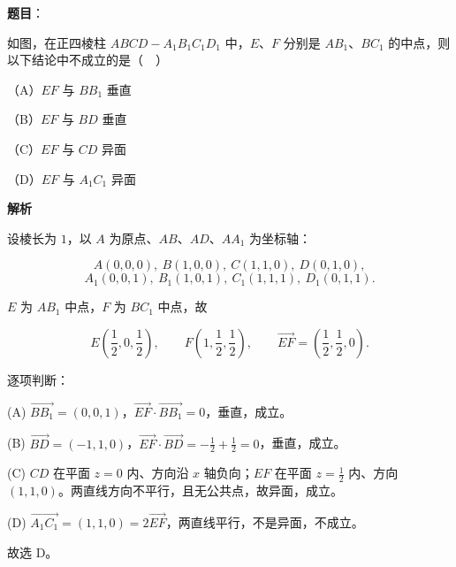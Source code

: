 \begin{answer}

\textbf{题目}：

如图，在正四棱柱 $ABCD-A_1B_1C_1D_1$ 中，$E$、$F$ 分别是 $AB_1$、$BC_1$ 的中点，则以下结论中不成立的是（　）
\nopagebreak[4]
\begin{center}\end{center}
\nopagebreak[4]
（A）$EF$ 与 $BB_1$ 垂直

（B）$EF$ 与 $BD$ 垂直

（C）$EF$ 与 $CD$ 异面

（D）$EF$ 与 $A_1C_1$ 异面

\textbf{解析}

设棱长为 $1$，以 $A$ 为原点、$AB$、$AD$、$AA_1$ 为坐标轴：

\nopagebreak[4]
\[A(0,0,0),\ B(1,0,0),\ C(1,1,0),\ D(0,1,0),\]
\nopagebreak[4]
\[A_1(0,0,1),\ B_1(1,0,1),\ C_1(1,1,1),\ D_1(0,1,1).\]

$E$ 为 $AB_1$ 中点，$F$ 为 $BC_1$ 中点，故

\nopagebreak[4]
\[E\left(\frac12,0,\frac12\right),\qquad F\left(1,\frac12,\frac12\right),\qquad \overrightarrow{EF}=\left(\frac12,\frac12,0\right).\]

逐项判断：

(A) $\overrightarrow{BB_1}=(0,0,1)$，$\overrightarrow{EF}\cdot\overrightarrow{BB_1}=0$，垂直，成立。

(B) $\overrightarrow{BD}=(-1,1,0)$，$\overrightarrow{EF}\cdot\overrightarrow{BD}=-\frac12+\frac12=0$，垂直，成立。

(C) $CD$ 在平面 $z=0$ 内、方向沿 $x$ 轴负向；$EF$ 在平面 $z=\frac12$ 内、方向 $(1,1,0)$。两直线方向不平行，且无公共点，故异面，成立。

(D) $\overrightarrow{A_1C_1}=(1,1,0)=2\overrightarrow{EF}$，两直线平行，不是异面，不成立。

故选 D。


\end{answer}
